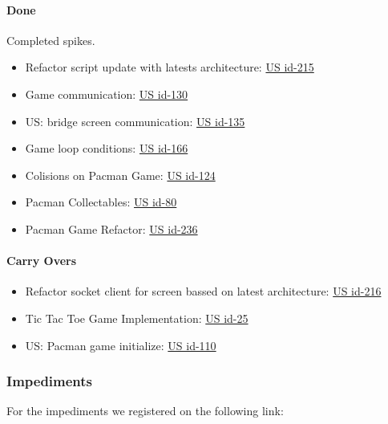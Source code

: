 \paragraph{Done}
Completed spikes.

\begin{itemize}
    \item Refactor script update with latests architecture: \href{https://tree.taiga.io/project/joseluis-teran-coffeetime/us/215?milestone=396824}{US id-215}
    \item Game communication: \href{https://tree.taiga.io/project/joseluis-teran-coffeetime/us/130?milestone=396824}{US id-130}
    \item US: bridge screen communication: \href{https://tree.taiga.io/project/joseluis-teran-coffeetime/us/135?milestone=396824}{US id-135}
    \item Game loop conditions: \href{https://tree.taiga.io/project/joseluis-teran-coffeetime/us/166?milestone=396824}{US id-166}
    \item  Colisions on Pacman Game: \href{https://tree.taiga.io/project/joseluis-teran-coffeetime/us/124?milestone=396824}{US id-124}
    \item  Pacman Collectables: \href{https://tree.taiga.io/project/joseluis-teran-coffeetime/us/80?milestone=396824}{US id-80}
    \item  Pacman Game Refactor: \href{https://tree.taiga.io/project/joseluis-teran-coffeetime/us/236?milestone=396824}{US id-236}
\end{itemize}

\paragraph{Carry Overs}
\begin{itemize}
    \item Refactor socket client for screen bassed on latest architecture: \href{https://tree.taiga.io/project/joseluis-teran-coffeetime/us/216?milestone=397461}{US id-216}
    \item Tic Tac Toe Game Implementation: \href{https://tree.taiga.io/project/joseluis-teran-coffeetime/us/25?milestone=397461}{US id-25}
    \item US: Pacman game initialize: \href{https://tree.taiga.io/project/joseluis-teran-coffeetime/us/110?milestone=397461}{US id-110}
\end{itemize}

\subsubsection{Impediments}
For the impediments we registered on the following link:

